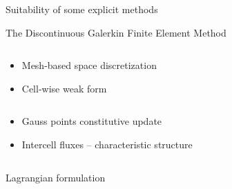 \begin{frame}{Suitability of some explicit methods}
\begin{block}{The Discontinuous Galerkin Finite Element Method \cite{Cockburn}}
\begin{overprint}
\begin{columns}
        \begin{footnotesize}
          \begin{column}{0.4\textwidth}
            \begin{itemize}
            \item[] Mesh-based space discretization
            \item[] Cell-wise weak form \cite{NeutronDG}
            \end{itemize}
          \end{column}
          \begin{column}{0.6\textwidth}
            \begin{itemize}
            \item[] Gauss points constitutive update
            \item[] Intercell fluxes -- characteristic structure
            \end{itemize}
          \end{column}
        \end{footnotesize}
      \end{columns}
      \vskip -10pt
      \begin{columns}
        \begin{column}{0.48\textwidth}
          \begin{block}{\footnotesize Lagrangian formulation \cite{LagrangianDG_thesis}}
            \centering
          \end{block}
        \end{column}
        \begin{column}{0.48\textwidth}
              

\end{column}
\end{columns}
\end{overprint}
\end{block}
\end{frame}
